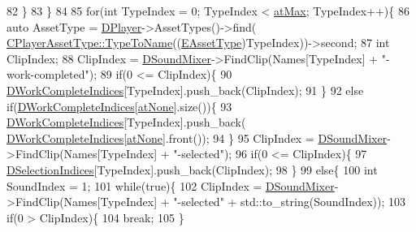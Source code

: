 \begin{DoxyCode}
82         \}
83     \}
84     
85     \textcolor{keywordflow}{for}(\textcolor{keywordtype}{int} TypeIndex = 0; TypeIndex < \hyperlink{GameDataTypes_8h_a5600d4fc433b83300308921974477feca92fbf60b4e5c335160f915b6a1c17c05}{atMax}; TypeIndex++)\{
86         \textcolor{keyword}{auto} AssetType = \hyperlink{classCSoundEventRenderer_ad98889d7f52477a2e148d7e390641d51}{DPlayer}->AssetTypes()->find(
      \hyperlink{classCPlayerAssetType_a66ce89c35b74940e9fc947a1f4b9e770}{CPlayerAssetType::TypeToName}((\hyperlink{GameDataTypes_8h_a5600d4fc433b83300308921974477fec}{EAssetType})TypeIndex))->second;
87         \textcolor{keywordtype}{int} ClipIndex;
88         ClipIndex = \hyperlink{classCSoundEventRenderer_a5abf598a7e8783d9cc78e0d33a65c9c2}{DSoundMixer}->FindClip(Names[TypeIndex] + \textcolor{stringliteral}{"-work-completed"});
89         \textcolor{keywordflow}{if}(0 <= ClipIndex)\{
90             \hyperlink{classCSoundEventRenderer_a59a26b4062659921cfb24d7f76253938}{DWorkCompleteIndices}[TypeIndex].push\_back(ClipIndex);
91         \}
92         \textcolor{keywordflow}{else} \textcolor{keywordflow}{if}(\hyperlink{classCSoundEventRenderer_a59a26b4062659921cfb24d7f76253938}{DWorkCompleteIndices}[\hyperlink{GameDataTypes_8h_a5600d4fc433b83300308921974477feca82fb51718e2c00981a2d37bc6fe92593}{atNone}].size())\{
93             \hyperlink{classCSoundEventRenderer_a59a26b4062659921cfb24d7f76253938}{DWorkCompleteIndices}[TypeIndex].push\_back(
      \hyperlink{classCSoundEventRenderer_a59a26b4062659921cfb24d7f76253938}{DWorkCompleteIndices}[\hyperlink{GameDataTypes_8h_a5600d4fc433b83300308921974477feca82fb51718e2c00981a2d37bc6fe92593}{atNone}].front());
94         \}
95         ClipIndex = \hyperlink{classCSoundEventRenderer_a5abf598a7e8783d9cc78e0d33a65c9c2}{DSoundMixer}->FindClip(Names[TypeIndex] + \textcolor{stringliteral}{"-selected"});
96         \textcolor{keywordflow}{if}(0 <= ClipIndex)\{
97             \hyperlink{classCSoundEventRenderer_afda3dfc8fa16264d91bc56a4bb1d150c}{DSelectionIndices}[TypeIndex].push\_back(ClipIndex);
98         \}
99         \textcolor{keywordflow}{else}\{
100             \textcolor{keywordtype}{int} SoundIndex = 1;
101             \textcolor{keywordflow}{while}(\textcolor{keyword}{true})\{
102                 ClipIndex = \hyperlink{classCSoundEventRenderer_a5abf598a7e8783d9cc78e0d33a65c9c2}{DSoundMixer}->FindClip(Names[TypeIndex] + \textcolor{stringliteral}{"-selected"} + 
      std::to\_string(SoundIndex));
103                 \textcolor{keywordflow}{if}(0 > ClipIndex)\{
104                     \textcolor{keywordflow}{break};   
105                 \}

\end{DoxyCode}

